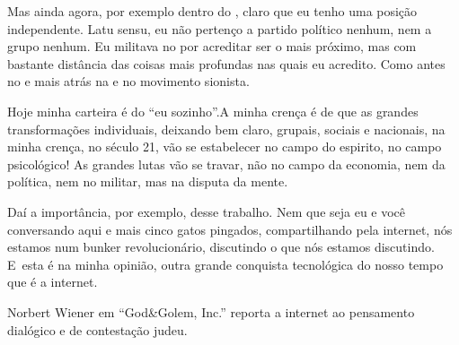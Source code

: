  

Mas ainda agora, por exemplo dentro do , claro que eu tenho uma
posição independente. Latu sensu, eu não pertenço a partido político
nenhum, nem a grupo nenhum. Eu militava no  por acreditar ser o mais
próximo, mas com bastante distância das coisas mais profundas nas quais
eu acredito. Como antes no  e mais atrás na  e no movimento
sionista.

Hoje minha carteira é do ``eu sozinho''.A minha crença é de que as
grandes transformações individuais, deixando bem claro, grupais, sociais
e nacionais, na minha crença, no século 21, vão se estabelecer no campo
do espirito, no campo psicológico! As grandes lutas vão se travar, não
no campo da economia, nem da política, nem no militar, mas na disputa da
mente.

 

Daí a importância, por exemplo, desse trabalho. Nem que seja eu e você
conversando aqui e mais cinco gatos pingados, compartilhando pela
internet, nós estamos num bunker revolucionário, discutindo o que nós
estamos discutindo. E~esta é na minha opinião, outra grande conquista
tecnológica do nosso tempo que é a internet.

 

Norbert Wiener em ``God\&Golem, Inc.'' reporta a internet ao pensamento
dialógico e de contestação judeu.%

\fechafala
